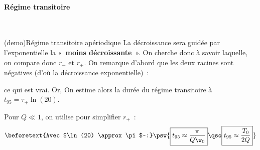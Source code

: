 \documentclass[../../main/main.tex]{subfiles}
\begin{document}
\paragraph{Régime transitoire}
~ \smallbreak

\begin{tcb*}[label=demo:transiaper, breakable](demo){Régime transitoire
			apériodique}
	La décroissance sera guidée par l'exponentielle la «~\textbf{moins
		décroissante}~». On cherche donc à savoir laquelle, on compare donc $r_-$ et
	$r_+$.
	\smallbreak
	On remarque d'abord que les deux racines sont négatives (d'où la décroissance
	exponentielle)~:
	\begin{isd}
		\vspace{-15pt}
		ce qui est vrai.
		\tcblower
		Or,
		\vspace{-25pt}
		On estime alors la durée du régime transitoire à $\boxed{t_{95} =
				\tau_+\ln(20)}$.
	\end{isd}
	\bigbreak
	Pour $Q \ll 1$, on utilise  pour
	simplifier $r_+$~:
	\vspace{-15pt}
	\begin{gather*}
		\beforetext{Avec $\ln(20) \approx \pi$~:}
		\psw{%
			\boxed{t_{95} \approx \frac{\pi}{Q\w_0}}
			\qso
			\boxed{t_{95} \approx \frac{T_0}{2Q}}
		}%
	\end{gather*}
\end{tcb*}
\end{document}
